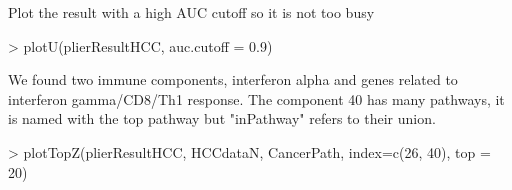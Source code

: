 \documentclass{article}
\begin{document}
Plot the result with a high AUC cutoff so it is not too busy
\begin{Schunk}
\begin{Sinput}
> plotU(plierResultHCC, auc.cutoff = 0.9)
\end{Sinput}
\end{Schunk}
We found two immune components, interferon alpha and genes related to interferon gamma/CD8/Th1 response. The component 40 has many pathways, it is named with the top pathway but "inPathway" refers to their union.
\begin{Schunk}
\begin{Sinput}
> plotTopZ(plierResultHCC, HCCdataN, CancerPath, index=c(26, 40), top = 20)
\end{Sinput}
\end{Schunk}
\end{document}

